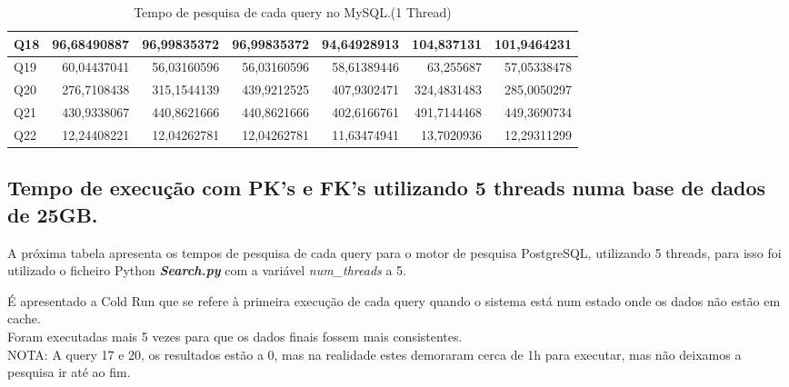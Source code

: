 \documentclass{article}
\begin{document}
\begin{table}[H]
{\begin{tabular}{|l|r|r|r|r|r|r|}
Q18&	96,68490887&	96,99835372&	96,99835372&	94,64928913	&104,837131	&101,9464231\\ \hline
Q19&	60,04437041&	56,03160596&	56,03160596&	58,61389446	&63,255687	&57,05338478\\ \hline
Q20&	276,7108438&	315,1544139&	439,9212525&	407,9302471	&324,4831483&	285,0050297\\ \hline
Q21&	430,9338067&	440,8621666&	440,8621666&	402,6166761	&491,7144468&	449,3690734 \\ \hline
Q22&	12,24408221&	12,04262781&	12,04262781&	11,63474941	&13,7020936	&12,29311299\\ \hline
    \end{tabular}}
    \caption{Tempo de pesquisa de cada query no MySQL.(1 Thread)}
    \label{tab:BC_Table3}
  \end{table}









\clearpage
\subsection{Tempo de execução com PK's e FK's utilizando 5 threads numa base de dados de 25GB.}
\texttt{}\par A próxima tabela apresenta os tempos de pesquisa de cada query para o motor de pesquisa PostgreSQL, utilizando 5 threads, para isso foi utilizado o ficheiro Python \textbf{\textit{Search.py}}  com a variável \textit{num\_threads} a 5. 
\texttt{}\par É apresentado a Cold Run que se refere à primeira execução de cada query quando o sistema está num estado onde os dados não estão em cache.\\
Foram executadas mais 5 vezes para que os dados finais fossem mais consistentes.\\
NOTA: A query 17 e 20, os resultados estão a 0, mas na realidade estes demoraram cerca de 1h para executar, mas não deixamos a pesquisa ir até ao fim.
\end{document}
